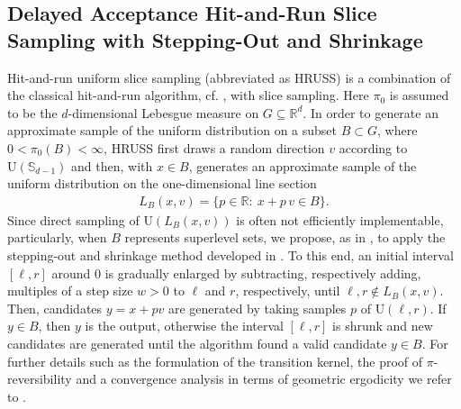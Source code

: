 \documentclass[sn-mathphys-num]{sn-jnl}%
\theoremstyle{thmstyleone}%
\theoremstyle{thmstyletwo}%
\theoremstyle{thmstylethree}%
\newcommand{\change}[1]{\bgroup\color{black}#1\egroup}    %
\begin{document}
\subsection{Delayed Acceptance Hit-and-Run Slice Sampling with Stepping-Out and Shrinkage}\label{sec:DA-HRUSS}

Hit-and-run uniform slice sampling (abbreviated as HRUSS) is a combination of the classical hit-and-run algorithm, cf. \cite{Smith1984}, with slice sampling. Here $\pi_0$ is assumed to be the $d$-dimensional Lebesgue measure on $G\subseteq \mathbb{R}^d$. 
In order to generate an approximate sample of the uniform distribution on a subset $B\subset G$, where $0 < \pi_0(B) < \infty$, HRUSS first draws a random direction $v$ according to $\mathrm{U}(\mathbb{S}_{d-1})$ 
and then, with $x\in B$, generates an approximate sample of the uniform distribution on the one-dimensional \change{line section}
\begin{align}\label{eq:line_section_def}
    L_{B}(x,v)=\{p \in \mathbb R\colon \ x+p\, v \in B \}.
\end{align}
Since direct sampling of $\mathrm U(L_{B}(x,v))$ is often not efficiently implementable, particularly, when $B$ represents superlevel sets, we propose, as in \cite{LatuszynskiRudolf2024}, to apply the stepping-out and shrinkage method developed in \cite{Neal2003}. 
To this end, an initial interval $[\ell, r]$ around $0$ is gradually enlarged by subtracting, respectively adding, multiples of a step size $w>0$ to $\ell$ and $r$, respectively, until $\ell,r \notin L_{B}(x,v)$. Then, candidates $y=x + p v$ are generated by taking samples $p$ of $\mathrm U(\ell,r)$. If $y \in B$, then $y$ is the output, otherwise the interval $[\ell,r]$ is shrunk and new candidates are generated until the algorithm found a valid candidate $y \in B$.
For further details such as the formulation of the transition kernel, the proof of $\pi$-reversibility and a convergence analysis in terms of geometric ergodicity we refer to \cite{LatuszynskiRudolf2024}.    
\end{document}
